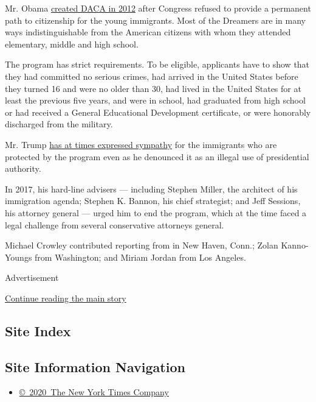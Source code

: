 Mr. Obama
\href{https://www.nytimes.com/2012/06/16/us/us-to-stop-deporting-some-illegal-immigrants.html}{created
DACA in 2012} after Congress refused to provide a permanent path to
citizenship for the young immigrants. Most of the Dreamers are in many
ways indistinguishable from the American citizens with whom they
attended elementary, middle and high school.

The program has strict requirements. To be eligible, applicants have to
show that they had committed no serious crimes, had arrived in the
United States before they turned 16 and were no older than 30, had lived
in the United States for at least the previous five years, and were in
school, had graduated from high school or had received a General
Educational Development certificate, or were honorably discharged from
the military.

Mr. Trump
\href{https://twitter.com/realdonaldtrump/status/908276308265795585?lang=en}{has
at times expressed sympathy} for the immigrants who are protected by the
program even as he denounced it as an illegal use of presidential
authority.

In 2017, his hard-line advisers --- including Stephen Miller, the
architect of his immigration agenda; Stephen K. Bannon, his chief
strategist; and Jeff Sessions, his attorney general --- urged him to end
the program, which at the time faced a legal challenge from several
conservative attorneys general.

Michael Crowley contributed reporting from in New Haven, Conn.; Zolan
Kanno-Youngs from Washington; and Miriam Jordan from Los Angeles.

Advertisement

\protect\hyperlink{after-bottom}{Continue reading the main story}

\hypertarget{site-index}{%
\subsection{Site Index}\label{site-index}}

\hypertarget{site-information-navigation}{%
\subsection{Site Information
Navigation}\label{site-information-navigation}}

\begin{itemize}
\tightlist
\item
  \href{https://help.nytimes.com/hc/en-us/articles/115014792127-Copyright-notice}{©~2020~The
  New York Times Company}
\end{itemize}

